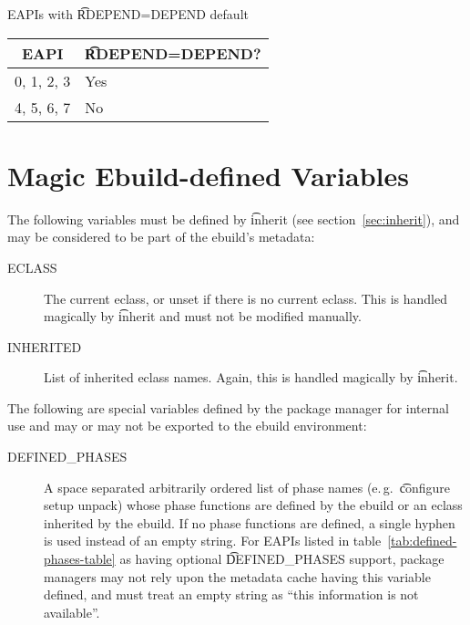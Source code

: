 \begin{centertable}{EAPIs with \t{RDEPEND=DEPEND} default}
    \label{tab:rdepend-depend-table}
    \begin{tabular}{ll}
      \toprule
      \multicolumn{1}{c}{\textbf{EAPI}} &
      \multicolumn{1}{c}{\textbf{\t{RDEPEND=DEPEND}?}} \\
      \midrule
      0, 1, 2, 3        & Yes \\
      4, 5, 6, 7        & No  \\
      \bottomrule
    \end{tabular}
\end{centertable}

\section{Magic Ebuild-defined Variables}

The following variables must be defined by \t{inherit} (see section~\ref{sec:inherit}), and may be
considered to be part of the ebuild's metadata:

\begin{description}
\item[ECLASS] The current eclass, or unset if there is no current eclass. This is handled magically
    by \t{inherit} and must not be modified manually.
\item[INHERITED] List of inherited eclass names. Again, this is handled magically by \t{inherit}.
\end{description}


The following are special variables defined by the package manager for internal use and may or may
not be exported to the ebuild environment:

\begin{description}
\item[DEFINED_PHASES]  A space separated arbitrarily ordered list
    of phase names (e.\,g.\ \t{configure setup unpack}) whose phase functions are defined by the
    ebuild or an eclass inherited by the ebuild. If no phase functions are defined, a single hyphen
    is used instead of an empty string. For EAPIs listed in table~\ref{tab:defined-phases-table}
    as having optional \t{DEFINED_PHASES} support, package managers may not rely upon the metadata
    cache having this variable defined, and must treat an empty string as ``this information is not
    available''.
\end{description}

